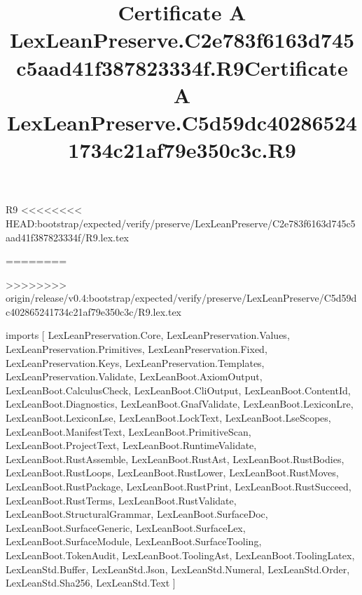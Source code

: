 \begin{lexlean}{R9}
<<<<<<<< HEAD:bootstrap/expected/verify/preserve/LexLeanPreserve/C2e783f6163d745c5aad41f387823334f/R9.lex.tex
\title{Certificate A LexLeanPreserve.C2e783f6163d745c5aad41f387823334f.R9}
========
\title{Certificate A LexLeanPreserve.C5d59dc402865241734c21af79e350c3c.R9}
>>>>>>>> origin/release/v0.4:bootstrap/expected/verify/preserve/LexLeanPreserve/C5d59dc402865241734c21af79e350c3c/R9.lex.tex
\begin{coremodule}
imports [
  LexLeanPreservation.Core,
  LexLeanPreservation.Values,
  LexLeanPreservation.Primitives,
  LexLeanPreservation.Fixed,
  LexLeanPreservation.Keys,
  LexLeanPreservation.Templates,
  LexLeanPreservation.Validate,
  LexLeanBoot.AxiomOutput,
  LexLeanBoot.CalculusCheck,
  LexLeanBoot.CliOutput,
  LexLeanBoot.ContentId,
  LexLeanBoot.Diagnostics,
  LexLeanBoot.GnafValidate,
  LexLeanBoot.LexiconLre,
  LexLeanBoot.LexiconLse,
  LexLeanBoot.LockText,
  LexLeanBoot.LseScopes,
  LexLeanBoot.ManifestText,
  LexLeanBoot.PrimitiveScan,
  LexLeanBoot.ProjectText,
  LexLeanBoot.RuntimeValidate,
  LexLeanBoot.RustAssemble,
  LexLeanBoot.RustAst,
  LexLeanBoot.RustBodies,
  LexLeanBoot.RustLoops,
  LexLeanBoot.RustLower,
  LexLeanBoot.RustMoves,
  LexLeanBoot.RustPackage,
  LexLeanBoot.RustPrint,
  LexLeanBoot.RustSucceed,
  LexLeanBoot.RustTerms,
  LexLeanBoot.RustValidate,
  LexLeanBoot.StructuralGrammar,
  LexLeanBoot.SurfaceDoc,
  LexLeanBoot.SurfaceGeneric,
  LexLeanBoot.SurfaceLex,
  LexLeanBoot.SurfaceModule,
  LexLeanBoot.SurfaceTooling,
  LexLeanBoot.TokenAudit,
  LexLeanBoot.ToolingAst,
  LexLeanBoot.ToolingLatex,
  LexLeanStd.Buffer,
  LexLeanStd.Json,
  LexLeanStd.Numeral,
  LexLeanStd.Order,
  LexLeanStd.Sha256,
  LexLeanStd.Text
]


\end{coremodule}
\end{lexlean}
